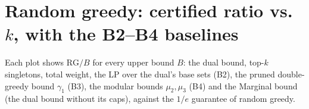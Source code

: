 \documentclass[twocolumn]{article}
\begin{document}
\section*{Random greedy: certified ratio vs.\ $k$, with the B2--B4 baselines}
Each plot shows $\mathrm{RG}/B$ for every upper bound $B$: the dual bound, top-$k$ singletons,
total weight, the LP over the dual's base sets (B2), the pruned double-greedy bound $\gamma_1$
(B3), the modular bounds $\mu_2,\mu_3$ (B4) and the Marginal bound (the dual bound without its
caps), against the $1/e$ guarantee of random greedy.








\end{document}
